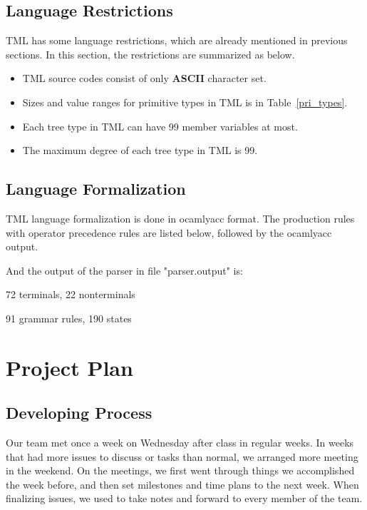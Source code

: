\documentclass[12pt,psfig,a4]{article}
\begin{document}

\subsection{Language Restrictions}
TML has some language restrictions, which are already mentioned in previous sections. In this section, the restrictions are summarized as below.
\begin{itemize}
\setlength{\itemsep}{0pt}
\setlength{\parskip}{0pt}
\item TML source codes consist of only \textbf{ASCII} character set.
\item Sizes and value ranges for primitive types in TML is in Table~\ref{pri_types}.
\item Each tree type in TML can have 99 member variables at most.
\item The maximum degree of each tree type in TML is 99.

\end{itemize}

\subsection{Language Formalization}
TML language formalization is done in ocamlyacc format. The production rules with operator precedence rules are listed below, followed by the ocamlyacc output.

\begin{tt}
\lstset{basicstyle=\scriptsize}

\mbox{}
\noindent
And the output of the parser in file "parser.output" is:

72 terminals, 22 nonterminals

91 grammar rules, 190 states
\end{tt}

\pagebreak
\section{Project Plan}

\subsection{Developing Process}
Our team met once a week on Wednesday after class in regular weeks. In weeks that had more issues to discuss or tasks than normal, we arranged more meeting in the weekend. On the meetings, we first went through things we accomplished the week before, and then set milestones and time plans to the next week. When finalizing issues, we used to take notes and forward to every member of the team.
\end{document}
